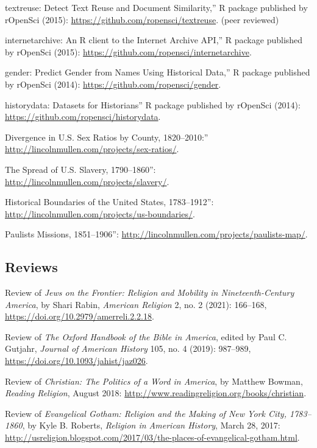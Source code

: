 \documentclass[11pt]{article}
\begin{document}
\noindent{}textreuse: Detect Text Reuse and Document Similarity,'' R package published by rOpenSci (2015): \url{https://github.com/ropensci/textreuse}. (peer reviewed)

\noindent{}internetarchive: An R client to the Internet Archive API,'' R package published by rOpenSci (2015): \url{https://github.com/ropensci/internetarchive}.

\noindent{}gender: Predict Gender from Names Using Historical Data,'' R package published by rOpenSci (2014): \url{https://github.com/ropensci/gender}.

\noindent{}historydata: Datasets for Historians'' R package published by rOpenSci (2014): \url{https://github.com/ropensci/historydata}.

\noindent{}Divergence in U.S. Sex Ratios by County, 1820--2010:'' \url{http://lincolnmullen.com/projects/sex-ratios/}.

\noindent{}The Spread of U.S.  Slavery, 1790--1860'':  \url{http://lincolnmullen.com/projects/slavery/}.

\noindent{}Historical Boundaries of the United States, 1783--1912'': \url{http://lincolnmullen.com/projects/us-boundaries/}.

\noindent{}Paulists Missions, 1851--1906'': \url{http://lincolnmullen.com/projects/paulists-map/}.


\subsection{Reviews}\label{Reviews}

Review of \emph{Jews on the Frontier: Religion and Mobility in Nineteenth-Century America}, by Shari Rabin, \emph{American Religion} 2, no. 2 (2021): 166--168, \url{https://doi.org/10.2979/amerreli.2.2.18}.

Review of \emph{The Oxford Handbook of the Bible in America}, edited by Paul C. Gutjahr, \emph{Journal of American History} 105, no. 4 (2019): 987--989, \url{https://doi.org/10.1093/jahist/jaz026}.

Review of \emph{Christian: The Politics of a Word in America}, by Matthew Bowman, \emph{Reading Religion}, August 2018: 
\url{http://www.readingreligion.org/books/christian}.

Review of \emph{Evangelical Gotham: Religion and the Making of New York City, 1783--1860}, by Kyle B. Roberts, \emph{Religion in American History}, March 28, 2017: \url{http://usreligion.blogspot.com/2017/03/the-places-of-evangelical-gotham.html}.
\end{document}
